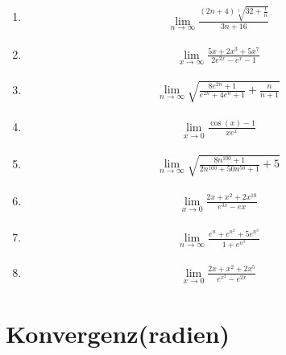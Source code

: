 \documentclass{article}
\begin{document}
\begin{multicols}{2}
\begin{enumerate}
    \item \begin{align*}
        \lim_{n \to \infty} \frac{(2n + 4)\sqrt[5]{32 + \frac{1}{n}}}{3n + 16}
    \end{align*}

    \item \begin{align*}
        \lim_{x \to \infty} \frac{5x + 2x^3 + 5x^7}{2e^{2x} - e^x - 1}
    \end{align*}

    \item \begin{align*}
        \lim_{n \to \infty} \sqrt{\frac{8e^{2n} + 1}{e^{2n} + 4e^n + 1} + \frac{n}{n + 1}}
    \end{align*}

    \item \begin{align*}
        \lim_{x \to 0} \frac{\cos(x) - 1}{xe^x}
    \end{align*}

    \item \begin{align*}
        \lim_{n \to \infty} \sqrt{\frac{8n^{100} + 1}{2n^{100} + 50n^{50} + 1} + 5}
    \end{align*}

    \item \begin{align*}
        \lim_{x \to 0} \frac{2x + x^2 + 2x^{10}}{e^{3x} - e{x}}
    \end{align*}

    \item \begin{align*}
        \lim_{n \to \infty} \frac{e^n + e^{n^2} + 5e^{n^3}}{1 + e^{n^3}}
    \end{align*}

    \item \begin{align*}
        \lim_{x \to 0} \frac{2x + x^2 + 2x^5}{e^{x^2} - e^{2x}}
    \end{align*}
\end{enumerate}
\end{multicols}

\section*{Konvergenz(radien)}
\end{document}
